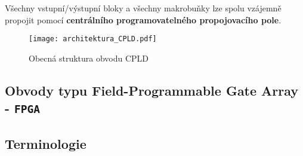     Všechny vstupní/výstupní bloky a všechny makrobuňky lze spolu vzájemně propojit pomocí
    \textbf{centrálního programovatelného propojovacího pole}.

        \begin{figure}[ht!]
          \centering
          \texttt{[image: architektura\_CPLD.pdf]}
          \caption[Struktura obvodu CPLD]{Obecná struktura obvodu CPLD}
          \label{PLO:fig_arch_CPLD}
        \end{figure} 
           
  \subsection{Obvody typu Field-Programmable Gate Array - \texttt{FPGA}}   
    \subsection{Terminologie}
